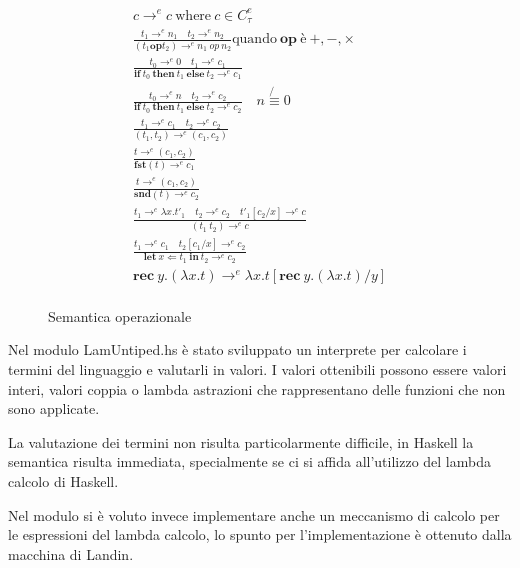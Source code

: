 \documentclass{article}
\newcommand{\rec}[2]{\mathbf{rec}\ #1 . ( #2 )}
\newcommand{\letin}[2]{\mathbf{let}\ #1\ \mathbf{in}\ #2}
\newcommand{\ite}[3]{\mathbf{if}\ #1\ \mathbf{then}\ #2\ \mathbf{else}\ #3}
\newcommand{\fst}[1]{\mathbf{fst} (#1)}
\newcommand{\snd}[1]{\mathbf{snd} (#1)}
\newcommand{\lamb}[2]{\lambda #1 . #2}
\begin{document}
\begin{figure}
\centering
\begin{gather*}
c \rightarrow^{e} c\ \mbox{where}\ c \in C^{e}_{\tau}
\\
\frac{
t_{1} \rightarrow^{e} n_{1} \quad t_{2} \rightarrow^{e} n_{2}
}{
(t_{1} \mathbf{op} t_{2}) \rightarrow^{e} n_{1}\ op\ n_{2}
}
\mbox{quando}\ \mathbf{op}\ \mbox{è}\ +,-,\times
\\
\frac{
t_{0} \rightarrow^{e} 0 \quad t_{1} \rightarrow^{e} c_{1}
}{
\ite{t_0}{t_{1}}{t_{2}\rightarrow^{e}c_{1}}
}
\\
\frac{
t_{0} \rightarrow^{e} n \quad t_{2} \rightarrow^{e} c_{2}
}{
\ite{t_0}{t_{1}}{t_{2}\rightarrow^{e}c_{2}}
}
\quad n\not{\equiv} 0
\\
\frac{
t_{1} \rightarrow^{e} c_{1} \quad t_{2} \rightarrow^{e} c_{2}
}{
(t_{1},t_{2}) \rightarrow^{e} (c_{1}, c_{2})
}
\\
\frac{
t \rightarrow^{e} (c_{1},c_{2})
}{
\fst{t} \rightarrow^{e} c_{1}
}
\\
\frac{
t \rightarrow^{e} (c_{1},c_{2})
}{
\snd{t} \rightarrow^{e} c_{2}
}
\\
\frac{
t_{1} \rightarrow^{e} \lamb{x}{t'_{1}} \quad t_{2} \rightarrow^{e} c_{2} \quad t'_{1}[c_{2}/x]\rightarrow^{e} c
}{
(t_{1} \ t_{2}) \rightarrow^{e} c
}
\\
\frac{
t_{1} \rightarrow^{e} c_{1} \quad t_{2}[c_{1}/x] \rightarrow^{e} c_{2}
}{
\letin{x \Leftarrow t_{1}}{t_{2}} \rightarrow^{e} c_{2}
}
\\
\rec{y}{\lamb{x}{t}} \rightarrow^{e} \lamb{x}{t[\rec{y}{\lamb{x}{t}}/y]}
\\
\end{gather*}
\caption{Semantica operazionale}
\label{fig:my_label}
\end{figure}


Nel modulo LamUntiped.hs è stato sviluppato un interprete per calcolare i termini  del linguaggio e valutarli in valori. I valori ottenibili possono essere valori interi, valori coppia o lambda astrazioni che rappresentano delle funzioni che non sono applicate.

La valutazione dei termini non risulta particolarmente difficile, in Haskell la semantica risulta immediata, specialmente se ci si affida all'utilizzo del lambda calcolo di Haskell.

Nel modulo si è voluto invece implementare anche un meccanismo di calcolo per le espressioni del lambda calcolo, lo spunto per l'implementazione è ottenuto dalla macchina di Landin.
\end{document}
